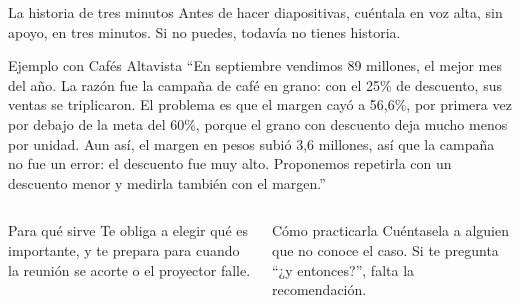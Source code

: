 \documentclass[aspectratio=169,11pt]{beamer}
\begin{document}
\begin{frame}[t]{La historia de tres minutos}
  \small Antes de hacer diapositivas, cuéntala en voz alta, sin apoyo, en
  tres minutos. Si no puedes, todavía no tienes historia.
  \vspace{0.1cm}
  \begin{exampleblock}{Ejemplo con Cafés Altavista}
    \footnotesize ``En septiembre vendimos 89 millones, el mejor mes del año.
    La razón fue la campaña de café en grano: con el 25\% de descuento, sus
    ventas se triplicaron. El problema es que el margen cayó a 56,6\%, por
    primera vez por debajo de la meta del 60\%, porque el grano con
    descuento deja mucho menos por unidad. Aun así, el margen en pesos subió
    3,6 millones, así que la campaña no fue un error: el descuento fue muy
    alto. Proponemos repetirla con un descuento menor y medirla también con
    el margen.''
  \end{exampleblock}
  \begin{columns}[T,onlytextwidth]
    \begin{block}{Para qué sirve}
      \footnotesize Te obliga a elegir qué es importante, y te prepara para
      cuando la reunión se acorte o el proyector falle.
    \end{block}
    \begin{block}{Cómo practicarla}
      \footnotesize Cuéntasela a alguien que no conoce el caso. Si te
      pregunta ``¿y entonces?'', falta la recomendación.
    \end{block}
  \end{columns}
\end{frame}
\end{document}
